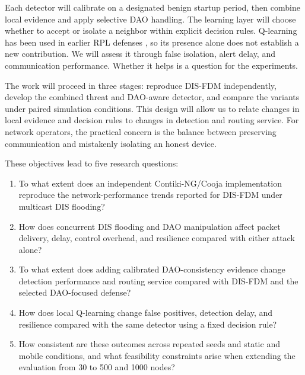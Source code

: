 \documentclass[journal]{IEEEtran}
\begin{document}
Each detector will calibrate on a designated benign startup period, then combine local evidence and apply selective DAO handling. The learning layer will choose whether to accept or isolate a neighbor within explicit decision rules. Q-learning has been used in earlier RPL defenses \cite{qsecrpl2023,itrpl2024}, so its presence alone does not establish a new contribution. We will assess it through false isolation, alert delay, and communication performance. Whether it helps is a question for the experiments.

The work will proceed in three stages: reproduce DIS-FDM independently, develop the combined threat and DAO-aware detector, and compare the variants under paired simulation conditions. This design will allow us to relate changes in local evidence and decision rules to changes in detection and routing service. For network operators, the practical concern is the balance between preserving communication and mistakenly isolating an honest device.

These objectives lead to five research questions:
\begin{enumerate}
\item[\emph{RQ1:}] To what extent does an independent Contiki-NG/Cooja implementation reproduce the network-performance trends reported for DIS-FDM under multicast DIS flooding?
\item[\emph{RQ2:}] How does concurrent DIS flooding and DAO manipulation affect packet delivery, delay, control overhead, and resilience compared with either attack alone?
\item[\emph{RQ3:}] To what extent does adding calibrated DAO-consistency evidence change detection performance and routing service compared with DIS-FDM and the selected DAO-focused defense?
\item[\emph{RQ4:}] How does local Q-learning change false positives, detection delay, and resilience compared with the same detector using a fixed decision rule?
\item[\emph{RQ5:}] How consistent are these outcomes across repeated seeds and static and mobile conditions, and what feasibility constraints arise when extending the evaluation from 30 to 500 and 1000 nodes?
\end{enumerate}
\end{document}
